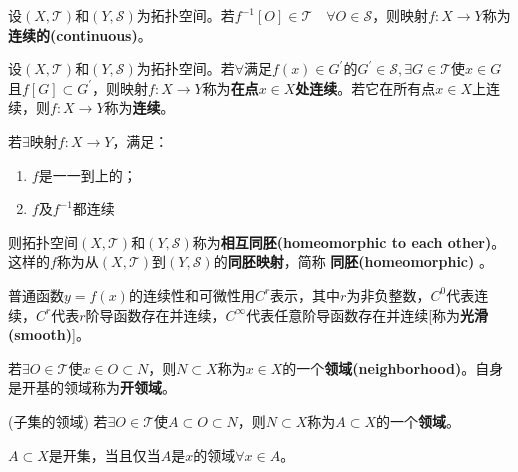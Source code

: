 \documentclass[a4paper]{article}
\begin{document}
\begin{ndefi}
    设$ (X, \mathcal{T}) $和$ (Y, \mathcal{S}) $为拓扑空间。若$ f^{-1}[O] \in \mathcal{T} \quad \forall O \in \mathcal{S} $，则映射$ f:X \to Y $称为\textbf{连续的(continuous)}。
\end{ndefi}

\begin{ndefi}
    设$ (X, \mathcal{T}) $和$ (Y, \mathcal{S}) $为拓扑空间。若$ \forall $满足$ f(x) \in G^{'} $的$ G^{'} \in \mathcal{S}, \exists G \in \mathcal{T} $使$ x \in G $且$ f[G] \subset G^{'} $，则映射$ f: X \to Y $称为\textbf{在点$ x \in X $处连续}。若它在所有点$ x \in X $上连续，则$ f: X \to Y $称为\textbf{连续}。
\end{ndefi}

\begin{ndefi}
    若$ \exists $映射$ f: X \to Y $，满足：
    \begin{enumerate}
        \item $ f $是一一到上的；
        \item $ f $及$ f^{-1} $都连续
    \end{enumerate}
    则拓扑空间$ (X, \mathcal{T}) $和$ (Y, \mathcal{S}) $称为\textbf{相互同胚(homeomorphic to each other)}。这样的$ f $称为从$ (X, \mathcal{T}) $到$ (Y, \mathcal{S}) $的\textbf{同胚映射}，简称\textbf{ 同胚(homeomorphic) }。
\end{ndefi}

\begin{concept}
    普通函数$ y=f(x) $的连续性和可微性用$ C^{r} $表示，其中$ r $为非负整数，$ C^{0} $代表连续，$ C^{r} $代表$ r $阶导函数存在并连续，$ C^{\infty} $代表任意阶导函数存在并连续[称为\textbf{光滑(smooth)}]。
\end{concept}

\begin{ndefi}
    若$ \exists O \in \mathcal{T} $使$ x \in O \subset N $，则$ N \subset X $称为$ x \in X $的一个\textbf{领域(neighborhood)}。自身是开基的领域称为\textbf{开领域}。
\end{ndefi}

\begin{ndefi}(子集的领域)
    若$ \exists O \in \mathcal{T} $使$ A \subset O \subset N $，则$ N \subset X $称为$ A \subset X $的一个\textbf{领域}。
\end{ndefi}

\begin{nthm}
    $ A \subset X $是开集，当且仅当$ A $是$ x $的领域$ \forall x \in A $。
\end{nthm}
\end{document}

